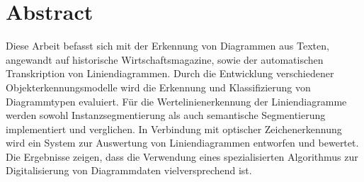 \chapter*{Abstract}
\label{ch:abstract}

Diese Arbeit befasst sich mit der Erkennung von Diagrammen aus Texten, angewandt auf historische Wirtschaftsmagazine, sowie der automatischen Transkription von Liniendiagrammen. Durch die Entwicklung verschiedener Objekterkennungsmodelle wird die Erkennung und Klassifizierung von Diagrammtypen evaluiert. Für die Wertelinienerkennung der Liniendiagramme werden sowohl Instanzsegmentierung als auch semantische Segmentierung implementiert und verglichen. In Verbindung mit optischer Zeichenerkennung wird ein System zur Auswertung von Liniendiagrammen entworfen und bewertet. Die Ergebnisse zeigen, dass die Verwendung eines spezialisierten Algorithmus zur Digitalisierung von Diagrammdaten vielversprechend ist.